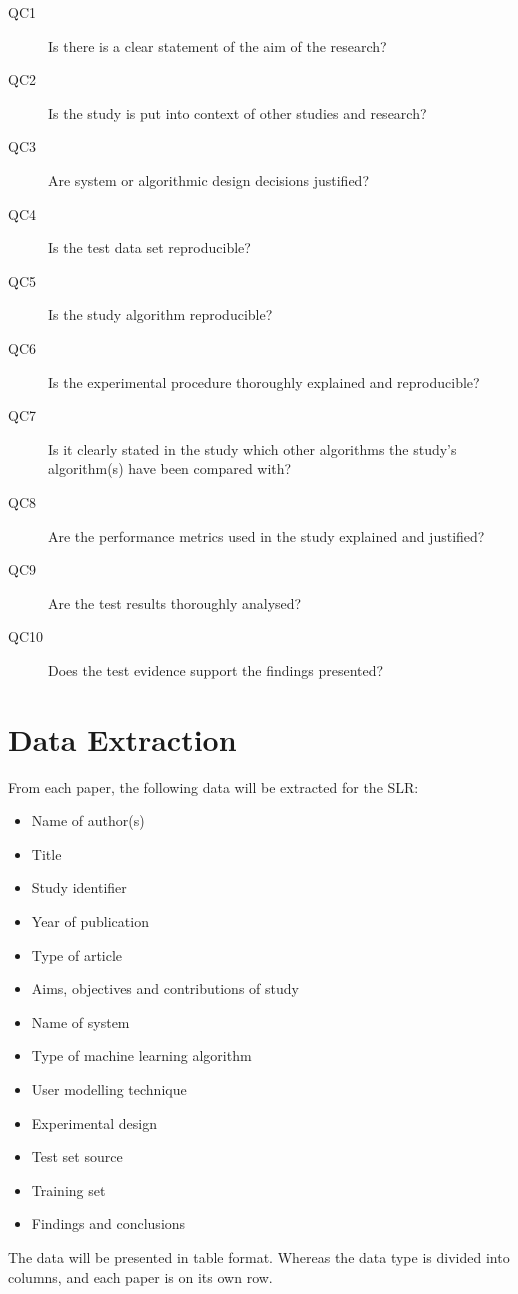 \begin{description}

\item[QC1] Is there is a clear statement of the aim of the research?
\item[QC2] Is the study is put into context of other studies and research?
\item[QC3] Are system or algorithmic design decisions justified?
\item[QC4] Is the test data set reproducible?
\item[QC5] Is the study algorithm reproducible?
\item[QC6] Is the experimental procedure thoroughly explained and reproducible?
\item[QC7] Is it clearly stated in the study which other algorithms the study's algorithm(s) have been compared with?
\item[QC8] Are the performance metrics used in the study explained and justified?
\item[QC9] Are the test results thoroughly analysed?
\item[QC10] Does the test evidence support the findings presented?

\end{description}

\section{Data Extraction}

From each paper, the following data will be extracted for the SLR:

\begin{itemize}

\item Name of author(s) 
\item Title
\item Study identifier
\item Year of publication 
\item Type of article
\item Aims, objectives and contributions of study
\item Name of system
\item Type of machine learning algorithm
\item User modelling technique
\item Experimental design
\item Test set source
\item Training set
\item Findings and conclusions

\end{itemize}

The data will be presented in table format. Whereas the data type is divided into columns, and each paper is on its own row.